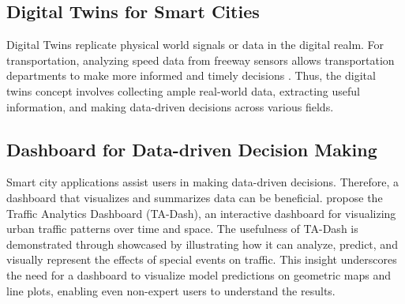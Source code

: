 \subsection{Digital Twins for Smart Cities}
 Digital Twins replicate physical world signals or data in the digital realm. For transportation, analyzing speed data from freeway sensors allows transportation departments to make more informed and timely decisions \autocite{hu2022digital}. Thus, the digital twins concept involves collecting ample real-world data, extracting useful information, and making data-driven decisions across various fields.

\subsection{Dashboard for Data-driven Decision Making}
 Smart city applications assist users in making data-driven decisions. Therefore, a dashboard that visualizes and summarizes data can be beneficial. \citet{tempelmeier2020ta} propose the Traffic Analytics Dashboard (TA-Dash), an interactive dashboard for visualizing urban traffic patterns over time and space. The usefulness of TA-Dash is demonstrated through showcased by illustrating how it can analyze, predict, and visually represent the effects of special events on traffic. This insight underscores the need for a dashboard to visualize model predictions on geometric maps and line plots, enabling even non-expert users to understand the results.

